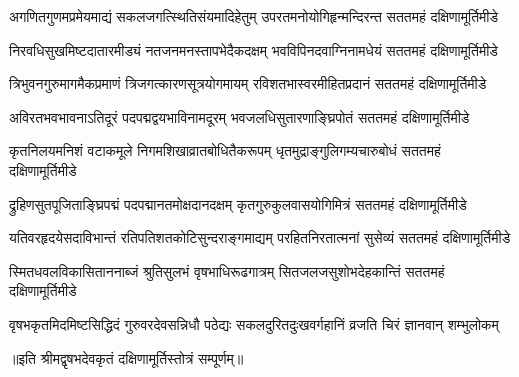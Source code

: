 
\fourlineindentedshloka
{अगणितगुणमप्रमेयमाद्यं}
{सकलजगत्स्थितिसंयमादिहेतुम्}
{उपरतमनोयोगिहृन्मन्दिरन्त}
{सततमहं दक्षिणामूर्तिमीडे}

\fourlineindentedshloka
{निरवधिसुखमिष्टदातारमीड्यं}
{नतजनमनस्तापभेदैकदक्षम्}
{भवविपिनदवाग्निनामधेयं}
{सततमहं दक्षिणामूर्तिमीडे}

\fourlineindentedshloka
{त्रिभुवनगुरुमागमैकप्रमाणं}
{त्रिजगत्कारणसूत्रयोगमायम्}
{रविशतभास्वरमीहितप्रदानं}
{सततमहं दक्षिणामूर्तिमीडे}

\fourlineindentedshloka
{अविरतभवभावनाऽतिदूरं}
{पदपद्मद्वयभाविनामदूरम्}
{भवजलधिसुतारणाङ्घ्रिपोतं}
{सततमहं दक्षिणामूर्तिमीडे}

\fourlineindentedshloka
{कृतनिलयमनिशं वटाकमूले}
{निगमशिखाव्रातबोधितैकरूपम्}
{धृतमुद्राङ्गुलिगम्यचारुबोधं}
{सततमहं दक्षिणामूर्तिमीडे}

\fourlineindentedshloka
{द्रुहिणसुतपूजिताङ्घ्रिपद्मं}
{पदपद्मानतमोक्षदानदक्षम्}
{कृतगुरुकुलवासयोगिमित्रं}
{सततमहं दक्षिणामूर्तिमीडे}

\fourlineindentedshloka
{यतिवरहृदयेसदाविभान्तं}
{रतिपतिशतकोटिसुन्दराङ्गमाद्यम्}
{परहितनिरतात्मनां सुसेव्यं}
{सततमहं दक्षिणामूर्तिमीडे}

\fourlineindentedshloka
{स्मितधवलविकासिताननाब्जं}
{श्रुतिसुलभं वृषभाधिरूढगात्रम्}
{सितजलजसुशोभदेहकान्तिं}
{सततमहं दक्षिणामूर्तिमीडे}

\fourlineindentedshloka
{वृषभकृतमिदमिष्टसिद्धिदं}
{गुरुवरदेवसन्निधौ पठेद्यः}
{सकलदुरितदुःखवर्गहानिं}
{व्रजति चिरं ज्ञानवान् शम्भुलोकम्}

॥इति श्रीमद्वृषभदेवकृतं दक्षिणामूर्तिस्तोत्रं सम्पूर्णम्॥